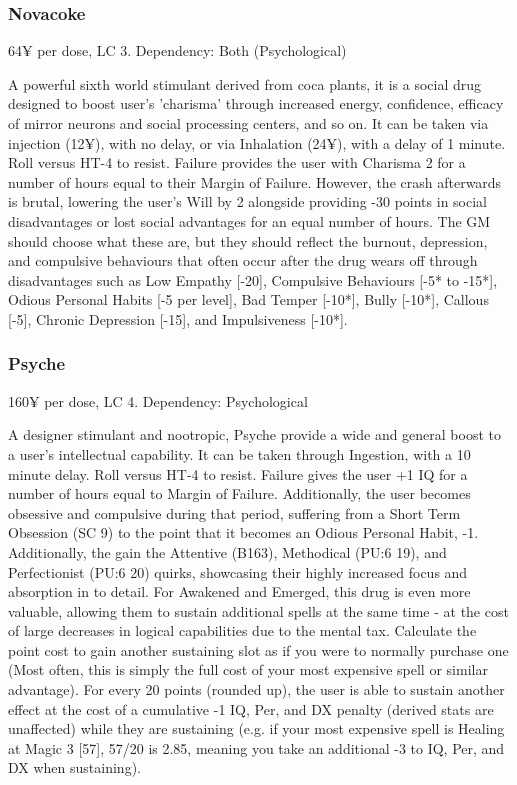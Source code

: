 \subsubsection{Novacoke}
\begin{flushleft}
	64¥ per dose, LC 3.
	Dependency: Both (Psychological)
\end{flushleft}

A powerful sixth world stimulant  derived from coca plants, it is a social drug designed to boost user's 'charisma' through increased energy, confidence, efficacy of mirror neurons and social processing centers, and so on. It can be taken via injection (12¥), with no delay, or via Inhalation (24¥), with a delay of 1 minute. Roll versus HT-4 to resist. Failure provides the user with Charisma 2 for a number of hours equal to their Margin of Failure. However, the crash afterwards is brutal, lowering the user's Will by 2 alongside providing -30 points in social disadvantages or lost social advantages for an equal number of hours. The GM should choose what these are, but they should reflect the burnout, depression, and compulsive behaviours that often occur after the drug wears off through disadvantages such as Low Empathy [-20], Compulsive Behaviours [-5* to -15*], Odious Personal Habits [-5 per level], Bad Temper [-10*], Bully [-10*], Callous [-5], Chronic Depression [-15], and Impulsiveness [-10*].

\subsubsection{Psyche}
\begin{flushleft}
	160¥ per dose, LC 4.
	Dependency: Psychological
\end{flushleft}

A designer stimulant and nootropic, Psyche provide a wide and general boost to a user's intellectual capability. It can be taken through Ingestion, with a 10 minute delay. Roll versus HT-4 to resist. Failure gives the user +1 IQ for a number of hours equal to Margin of Failure. Additionally, the user becomes obsessive and compulsive during that period, suffering from a Short Term Obsession (SC 9) to the point that it becomes an Odious Personal Habit, -1. Additionally, the gain the Attentive (B163), Methodical (PU:6 19), and Perfectionist (PU:6 20) quirks, showcasing their highly increased focus and absorption in to detail. For Awakened and Emerged, this drug is even more valuable, allowing them to sustain additional spells at the same time - at the cost of large decreases in logical capabilities due to the mental tax. Calculate the point cost to gain another sustaining slot as if you were to normally purchase one (Most often, this is simply the full cost of your most expensive spell or similar advantage). For every 20 points (rounded up), the user is able to sustain another effect at the cost of a cumulative -1 IQ, Per, and DX penalty (derived stats are unaffected) while they are sustaining (e.g. if your most expensive spell is Healing at Magic 3 [57], 57/20 is 2.85, meaning you take an additional -3 to IQ, Per, and DX when sustaining).

